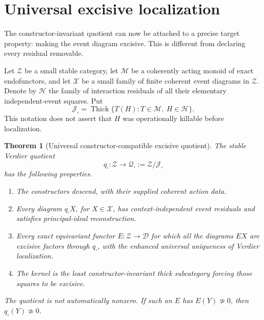 \documentclass[11pt]{article}
\newtheorem{theorem}{Theorem}[section]
\theoremstyle{definition}
\theoremstyle{remark}
\begin{document}
\section{Universal excisive localization}\label{sec:excisive-localization}

The constructor-invariant quotient can now be attached to a precise target property: making the event diagram excisive. This is different from declaring every residual removable.

Let $\mathcal Z$ be a small stable category, let $\mathscr M$ be a coherently acting monoid of exact endofunctors, and let $\mathscr X$ be a small family of finite coherent event diagrams in $\mathcal Z$. Denote by $\mathscr H$ the family of interaction residuals of all their elementary independent-event squares. Put
\[
 \mathcal J_{\square}
 =\operatorname{Thick}\{T(H):T\in\mathscr M,\ H\in\mathscr H\}.
\]
This notation does not assert that $H$ was operationally killable before localization.

\begin{theorem}[Universal constructor-compatible excisive quotient]\label{thm:excisive-quotient}
The stable Verdier quotient
\[
 q_{\square}:\mathcal Z\longrightarrow\mathcal Q_{\square}
 :=\mathcal Z/\mathcal J_{\square}
\]
has the following properties.
\begin{enumerate}
\item The constructors descend, with their supplied coherent action data.
\item Every diagram $q_{\square}X$, for $X\in\mathscr X$, has context-independent event residuals and satisfies principal-ideal reconstruction.
\item Every exact equivariant functor $E:\mathcal Z\to\mathcal D$ for which all the diagrams $EX$ are excisive factors through $q_{\square}$, with the enhanced universal uniqueness of Verdier localization.
\item The kernel is the least constructor-invariant thick subcategory forcing those squares to be excisive.
\end{enumerate}
The quotient is not automatically nonzero. If such an $E$ has $E(Y)\not\simeq0$, then $q_{\square}(Y)\not\simeq0$.
\end{theorem}
\end{document}
